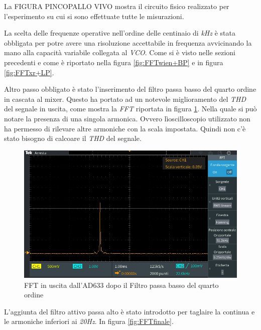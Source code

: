 \documentclass[titlepage]{report}
\begin{document}
	La FIGURA PINCOPALLO VIVO mostra il circuito fisico realizzato per l'esperimento su cui si sono effettuate tutte le misurazioni.


	La scelta delle frequenze operative nell'ordine delle centinaio di \textit{kHz} è stata obbligata per potre avere una risoluzione accettabile in frequenza avvicinando la mano alla capacità variabile collegata al \textit{VCO}.
	Come si è visto nelle sezioni precedenti e come è riportato nella figura \ref{fig:FFTwien+BP} e in figura \ref{fig:FFTxr+LP}.

	Altro passo obbligato è stato l'inserimento del filtro passa basso del quarto ordine in cascata al mixer. Questo ha portato ad un notevole miglioramento del \textit{THD} del segnale in uscita, come mostra la \textit{FFT} riportata in figura \ref{fig:FFTAD33+LP4}. Nella quale si può notare la presenza di una singola armonica. Ovvero lìoscilloscopio utilizzato non ha permesso di rilevare altre armoniche con la scala impostata. Quindi non c'è stato bisogno di calcoare il \textit{THD} del segnale.
	
	\begin{figure}[H]
		\centering
		\includegraphics[scale = 0.5]{Immagini/fft_ad633+lp4.PNG}
		\caption{FFT in uscita dall'AD633 dopo il Filtro passa basso del quarto ordine}
		\label{fig:FFTAD33+LP4}
	\end{figure}

	L'aggiunta del filtro attivo passa alto è stato introdotto per taglaire la continua e le armoniche inferiori ai \textit{20Hz}.
	In figura \ref{fig:FFTfinale}.
\end{document}
